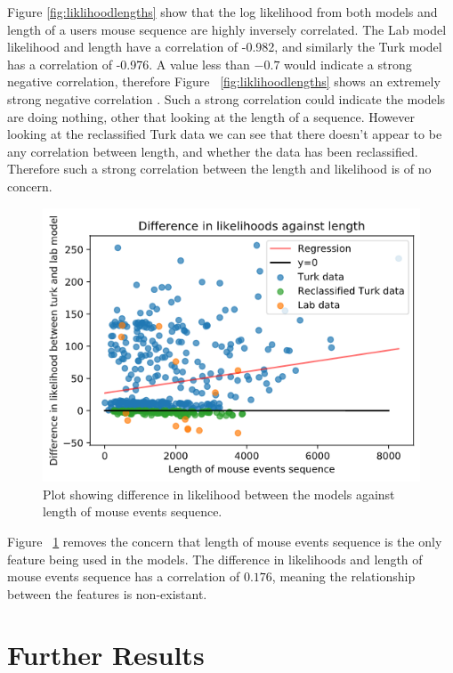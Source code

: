 \documentclass{article}
\begin{document}
Figure \ref{fig:liklihoodlengths} show that the log likelihood from both models and length of a users mouse sequence are highly inversely correlated. 
The Lab model likelihood and length have a correlation of -0.982, and similarly the Turk model has a correlation of -0.976.
A value less than $-0.7$ would indicate a strong negative correlation, therefore Figure ~\ref{fig:liklihoodlengths} shows an extremely strong negative correlation \cite{mindrila2017scatterplots}.
Such a strong correlation could indicate the models are doing nothing, other that looking at the length of a sequence.
However looking at the reclassified Turk data we can see that there doesn't appear to be any correlation between length, and whether the data has been reclassified.
Therefore such a strong correlation between the length and likelihood is of no concern. 

\begin{figure}[ht!]
    \centering
    \includegraphics[scale=0.4]{Images/Difference-Liklihood-Length.png}
    \caption{Plot showing difference in likelihood between the models against length of mouse events sequence. }
    \label{fig:diffliklihoodlengths}
\end{figure}

Figure ~\ref{fig:diffliklihoodlengths} removes the concern that length of mouse events sequence is the only feature being used in the models.
The difference in likelihoods and length of mouse events sequence has a correlation of $0.176$, meaning the relationship between the features is non-existant.

\section{Further Results}
\end{document}
